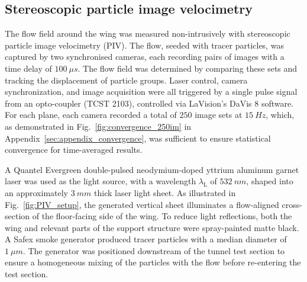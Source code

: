 \documentclass[wes, manuscript]{copernicus}
\begin{document}
\subsection{Stereoscopic particle image velocimetry}
%
The flow field around the wing was measured non-intrusively with stereoscopic particle image velocimetry (PIV). The flow, seeded with tracer particles, was captured by two synchronised cameras, each recording pairs of images with a time delay of $100~\unit{\mu s}$. The flow field was determined by comparing these sets and tracking the displacement of particle groups. Laser control, camera synchronization, and image acquisition were all triggered by a single pulse signal from an opto-coupler (TCST 2103), controlled via LaVision's DaVis $8$ software. For each plane, each camera recorded a total of $250$ image sets at $15~\unit{Hz}$, which, as demonstrated in Fig.~\ref{fig:convergence_250im} in Appendix~\ref{sec:appendix_convergence}, was sufficient to ensure statistical convergence for time-averaged results.

A Quantel Evergreen double-pulsed neodymium-doped yttrium aluminum garnet laser was used as the light source, with a wavelength $\lambda_{\textrm{L}}$ of $532~\unit{nm}$, shaped into an approximately $3~\unit{mm}$ thick laser light sheet. As illustrated in Fig.~\ref{fig:PIV_setup}, the generated vertical sheet illuminates a flow-aligned cross-section of the floor-facing side of the wing. To reduce light reflections, both the wing and relevant parts of the support structure were spray-painted matte black. A Safex smoke generator produced tracer particles with a median diameter of $1~\unit{\mu m}$. The generator was positioned downstream of the tunnel test section to ensure a homogeneous mixing of the particles with the flow before re-entering the test section.
\end{document}
